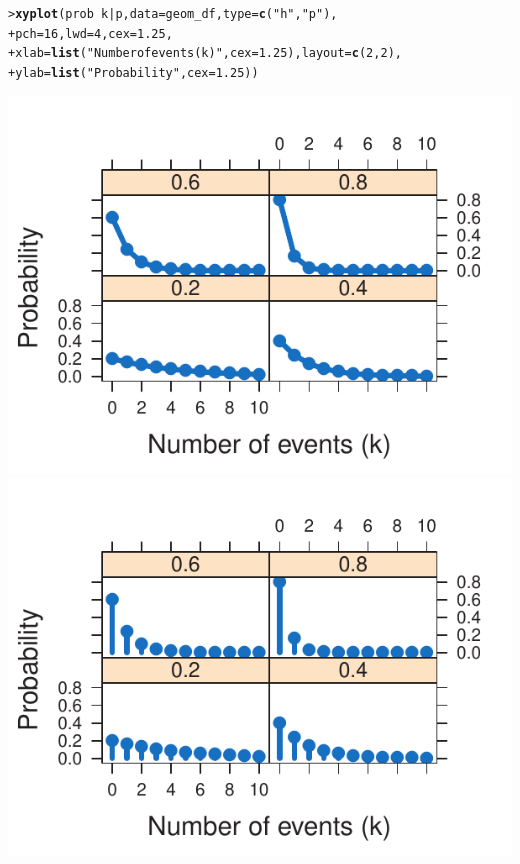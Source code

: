 \documentclass[11pt]{report}\usepackage[]{graphicx}\usepackage[]{color}
\makeatletter
\newcommand{\hlnum}[1]{\textcolor[rgb]{0.686,0.059,0.569}{#1}}%
\newcommand{\hlstr}[1]{\textcolor[rgb]{0.192,0.494,0.8}{#1}}%
\newcommand{\hlopt}[1]{\textcolor[rgb]{0,0,0}{#1}}%
\newcommand{\hlstd}[1]{\textcolor[rgb]{0.345,0.345,0.345}{#1}}%
\newcommand{\hlkwc}[1]{\textcolor[rgb]{0.333,0.667,0.333}{#1}}%
\newcommand{\hlkwd}[1]{\textcolor[rgb]{0.737,0.353,0.396}{\textbf{#1}}}%
\newenvironment{kframe}{%
 \def\at@end@of@kframe{}%
 \ifinner\ifhmode%
  \def\at@end@of@kframe{\end{minipage}}%
  \begin{minipage}{\columnwidth}%
 \fi\fi%
 \def\FrameCommand##1{\hskip\@totalleftmargin \hskip-\fboxsep
 \colorbox{shadecolor}{##1}\hskip-\fboxsep
     \hskip-\linewidth \hskip-\@totalleftmargin \hskip\columnwidth}%
 \MakeFramed {\advance\hsize-\width
   \@totalleftmargin\z@ \linewidth\hsize
   \@setminipage}}%
 {\par\unskip\endMakeFramed%
 \at@end@of@kframe}
\newenvironment{knitrout}{}{} %
\renewenvironment{knitrout}{\small\renewcommand{\baselinestretch}{.85}}{} %
\makeatother
\begin{document}
\begin{Exercises}
\begin{enumerate}
\begin{ans}
\begin{knitrout}
\begin{kframe}
\begin{alltt}
\hlstd{> }\hlkwd{xyplot}\hlstd{(prob} \hlopt{~} \hlstd{k} \hlopt{|} \hlstd{p ,} \hlkwc{data} \hlstd{= geom_df,} \hlkwc{type} \hlstd{=} \hlkwd{c}\hlstd{(}\hlstr{"h"}\hlstd{,} \hlstr{"p"}\hlstd{),}
\hlstd{+ }       \hlkwc{pch} \hlstd{=} \hlnum{16}\hlstd{,} \hlkwc{lwd} \hlstd{=} \hlnum{4}\hlstd{,} \hlkwc{cex} \hlstd{=} \hlnum{1.25}\hlstd{,}
\hlstd{+ }       \hlkwc{xlab} \hlstd{=} \hlkwd{list}\hlstd{(}\hlstr{"Number of events (k)"}\hlstd{,} \hlkwc{cex} \hlstd{=} \hlnum{1.25}\hlstd{),} \hlkwc{layout} \hlstd{=} \hlkwd{c}\hlstd{(}\hlnum{2}\hlstd{,}\hlnum{2}\hlstd{),}
\hlstd{+ }       \hlkwc{ylab} \hlstd{=} \hlkwd{list}\hlstd{(}\hlstr{"Probability"}\hlstd{,} \hlkwc{cex} \hlstd{=} \hlnum{1.25}\hlstd{))}
\end{alltt}
\end{kframe}

\centerline{\includegraphics{soln/fig/ex3_2a-1} 
\includegraphics{soln/fig/ex3_2a-2} }




\end{knitrout}
\end{ans}
\end{enumerate}
\end{Exercises}
\end{document}
